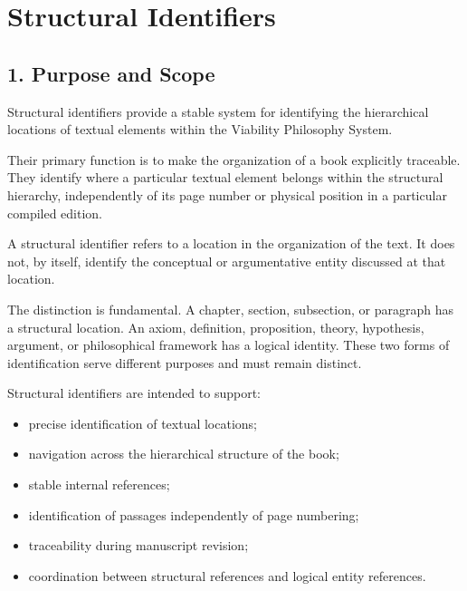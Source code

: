 
\cleardoublepage

\section*{Structural Identifiers}

{}


\subsection*{1. Purpose and Scope}

Structural identifiers provide a stable system for
identifying the hierarchical locations of textual
elements within the Viability Philosophy System.

Their primary function is to make the organization
of a book explicitly traceable. They identify where
a particular textual element belongs within the
structural hierarchy, independently of its page
number or physical position in a particular
compiled edition.

A structural identifier refers to a location in
the organization of the text. It does not, by itself,
identify the conceptual or argumentative entity
discussed at that location.

The distinction is fundamental. A chapter, section,
subsection, or paragraph has a structural location.
An axiom, definition, proposition, theory, hypothesis,
argument, or philosophical framework has a logical
identity. These two forms of identification serve
different purposes and must remain distinct.

Structural identifiers are intended to support:

\begin{itemize}
    \item precise identification of textual locations;
    \item navigation across the hierarchical structure
    of the book;
    \item stable internal references;
    \item identification of passages independently
    of page numbering;
    \item traceability during manuscript revision;
    \item coordination between structural references
    and logical entity references.
\end{itemize}

